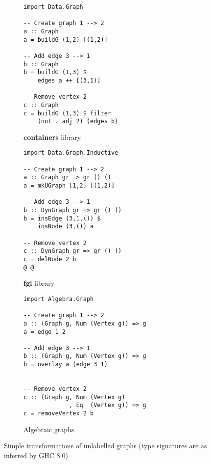 \documentclass[acmlarge,anonymous]{acmart}\settopmatter{printfolios=true}
\begin{document}
\begin{figure}
\begin{subfigure}[b]{0.28\linewidth}
\begin{verbatim}
import Data.Graph

-- Create graph 1 --> 2
a :: Graph
a = buildG (1,2) [(1,2)]

-- Add edge 3 --> 1
b :: Graph
b = buildG (1,3) $
    edges a ++ [(3,1)]

-- Remove vertex 2
c :: Graph
c = buildG (1,3) $ filter
    (not . adj 2) (edges b)
\end{verbatim}
\caption{\textbf{\textsf{containers}} library}
\end{subfigure}
\hfill
\vrule
\hfill
\hfill
\begin{subfigure}[b]{0.3\linewidth}
\begin{verbatim}
import Data.Graph.Inductive

-- Create graph 1 --> 2
a :: Graph gr => gr () ()
a = mkUGraph [1,2] [(1,2)]

-- Add edge 3 --> 1
b :: DynGraph gr => gr () ()
b = insEdge (3,1,()) $
    insNode (3,()) a

-- Remove vertex 2
c :: DynGraph gr => gr () ()
c = delNode 2 b
@ @
\end{verbatim}
\caption{\textbf{\textsf{fgl}} library}
\end{subfigure}
\hfill
\vrule
\hfill
\hfill
\begin{subfigure}[b]{0.35\linewidth}
\begin{verbatim}
import Algebra.Graph

-- Create graph 1 --> 2
a :: (Graph g, Num (Vertex g)) => g
a = edge 1 2

-- Add edge 3 --> 1
b :: (Graph g, Num (Vertex g)) => g
b = overlay a (edge 3 1)


-- Remove vertex 2
c :: (Graph g, Num (Vertex g)
             , Eq  (Vertex g)) => g
c = removeVertex 2 b
\end{verbatim}
\caption{Algebraic graphs}
\end{subfigure}
\caption{Simple transformations of unlabelled graphs (type signatures are
as inferred by GHC 8.0)\label{fig-example}}
\end{figure}


\end{document}

